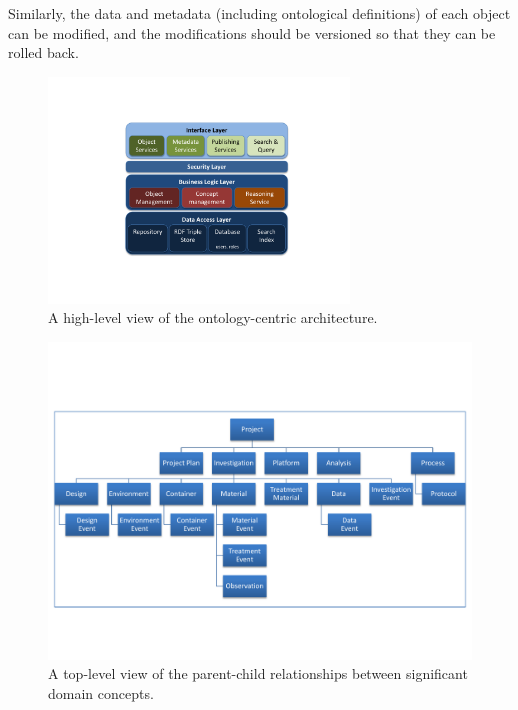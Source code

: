 \documentclass[conference,10pt]{IEEEtran}
\begin{document}
Similarly, the data and metadata (including ontological definitions) of each object can be modified, and the modifications should be versioned so that they can be rolled back.

\vspace{-8pt}
\begin{figure}[htb]
\centering
\includegraphics[trim = 60mm 30mm 50mm 36mm, clip,height=60mm]{architecture.pdf}
\vspace{-20pt} \caption{A high-level view of the ontology-centric architecture.}\label{fig:arch}
\end{figure}

\vspace{-8pt}
\begin{figure}[htb]
\centering
\includegraphics[trim = 0mm 30mm 0mm 36mm, clip,width=150mm]{top_ont.pdf}
\vspace{-8pt}
\caption{A top-level view of the parent-child relationships between significant domain concepts.}\label{fig:ont}
\end{figure}
\end{document}
